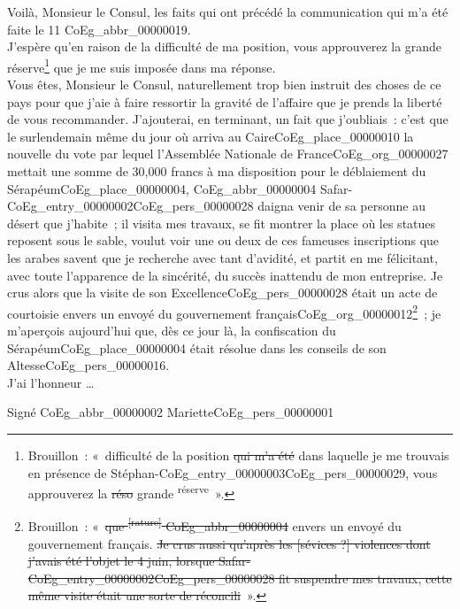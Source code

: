 \documentclass{book}
\begin{document}
\indent Voilà, Monsieur le Consul, les faits qui ont précédé la communication qui m’a été faite le 11 \gls{CoEg_abbr_00000019}.\\
\indent J’espère qu’en raison de la difficulté de ma position, vous approuverez la grande réserve\footnote{Brouillon~: «~difficulté de la position \sout{qui m’a été} dans laquelle je me trouvais en présence de Stéphan-\gls{CoEg_entry_00000003}\gls{CoEg_pers_00000029}, vous approuverez la \sout{réso} grande \textsuperscript{réserve}~».} que je me suis imposée dans ma réponse.\\
\indent Vous êtes, Monsieur le Consul, naturellement trop bien instruit des choses de ce pays pour que j’aie à faire ressortir la gravité de l’affaire que je prends la liberté de vous recommander. J’ajouterai, en terminant, un fait que j’oubliais~: c’est que le surlendemain même du jour où arriva au Caire\gls{CoEg_place_00000010} la nouvelle du vote par lequel l’Assemblée Nationale de France\gls{CoEg_org_00000027} mettait une somme de 30,000 francs à ma disposition pour le déblaiement du Sérapéum\gls{CoEg_place_00000004}, \gls{CoEg_abbr_00000004} Safar-\Gls{CoEg_entry_00000002}\gls{CoEg_pers_00000028} daigna venir de sa personne au désert que j’habite~; il visita mes travaux, se fit montrer la place où les statues reposent sous le sable, voulut voir une ou deux de ces fameuses inscriptions que les arabes savent que je recherche avec tant d’avidité, et partit en me félicitant, avec toute l’apparence de la sincérité, du succès inattendu de mon entreprise. Je crus alors que la visite de son Excellence\gls{CoEg_pers_00000028} était un acte de courtoisie envers un envoyé du gouvernement français\gls{CoEg_org_00000012}\footnote{Brouillon~: «~\sout{que \textsuperscript{[rature]} \gls{CoEg_abbr_00000004}} envers un envoyé du gouvernement français. \sout{Je crus aussi qu’après les [sévices ?] violences dont j’avais été l’objet le 4 juin, lorsque Safar-\Gls{CoEg_entry_00000002}\gls{CoEg_pers_00000028} fit  suspendre mes travaux, cette même visite était une sorte de réconcili}~».}~; je m’aperçois aujourd’hui que, dès ce jour là, la confiscation du Sérapéum\gls{CoEg_place_00000004} était résolue dans les conseils de son Altesse\gls{CoEg_pers_00000016}.\\
\indent J’ai l’honneur … \\
\begin{flushright}
Signé \gls{CoEg_abbr_00000002} Mariette\gls{CoEg_pers_00000001}
\end{flushright}
\end{document}
